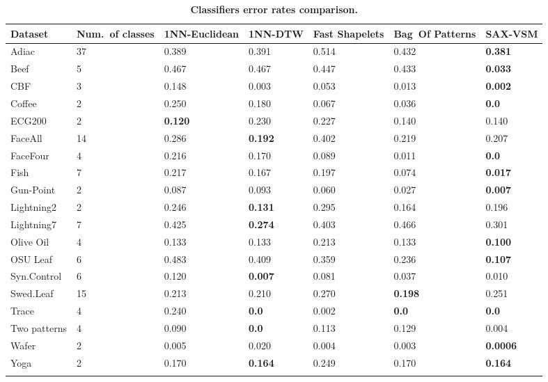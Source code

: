 \documentclass[conference]{IEEEtran}
\begin{document}
\begin{footnotesize}
\begin{table}[t]
\vspace{-0.2cm}
\caption{\bf Classifiers error rates comparison.}
 \label{perf_table}
\centering
\begin{tabularx}{\linewidth}{@{} l *6X @{}}
\hline
Dataset & \mbox{Num. of} classes & 1NN-Euclidean & 1NN-DTW & Fast Shapelets &  \mbox{Bag Of} \mbox{Patterns}
& SAX-VSM\\
\hline
Adiac        &37  & 0.389   & 0.391  & 0.514  & 0.432  & \textbf{0.381}\\
Beef         &5   & 0.467   & 0.467  & 0.447  & 0.433  & \textbf{0.033}\\
CBF         & 3  & 0.148    & 0.003  & 0.053    & 0.013 & \textbf{0.002} \\
Coffee       &2    & 0.250   & 0.180  & 0.067     & 0.036     & \textbf{0.0} \\
ECG200     &2   & \textbf{0.120}  & 0.230  & 0.227     & 0.140   & 0.140 \\
FaceAll      &14  & 0.286   & \textbf{0.192}  & 0.402     & 0.219   & 0.207\\
FaceFour    &4   & 0.216   & 0.170  & 0.089     & 0.011   & \textbf{0.0} \\
Fish         &7   & 0.217   & 0.167  & 0.197    & 0.074   & \textbf{0.017} \\
Gun-Point    &2   & 0.087   & 0.093  & 0.060     & 0.027     & \textbf{0.007} \\
Lightning2    &2   & 0.246   & \textbf{0.131}  & 0.295  & 0.164  & 0.196 \\
Lightning7    &7   & 0.425   & \textbf{0.274}  & 0.403  & 0.466  & 0.301 \\
Olive Oil     &4   & 0.133   & 0.133  & 0.213     & 0.133  & \textbf{0.100}\\
OSU Leaf    &6   & 0.483   & 0.409  & 0.359     & 0.236  & \textbf{0.107} \\
Syn.Control  &6   & 0.120   & \textbf{0.007}  & 0.081     & 0.037  & 0.010 \\
Swed.Leaf   &15  & 0.213   & 0.210 & 0.270 & \textbf{0.198} & 0.251 \\
Trace       &4   & 0.240   & \textbf{0.0}    & 0.002  & \textbf{0.0} & \textbf{0.0} \\
Two patterns &4   & 0.090   & \textbf{0.0}    & 0.113   & 0.129      & 0.004 \\
Wafer        &2    & 0.005   & 0.020     & 0.004  & 0.003 & \textbf{0.0006} \\
Yoga        &2    & 0.170   & \textbf{0.164}  & 0.249 & 0.170 & \textbf{0.164} \\
\hline
\vspace{-0.1cm}
\end{tabularx}
\end{table}
\end{footnotesize}
\end{document}
